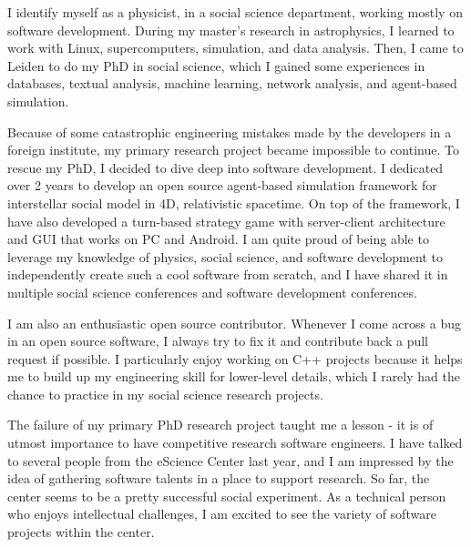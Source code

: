 \documentclass[11pt, a4paper]{awesome-cv}
\begin{document}
\makecvheader[R]

\makecvfooter
  {}%
  {}%
  {}

\makelettertitle

\begin{cvletter}

I identify myself as a physicist, in a social science department, working mostly on software development.
During my master's research in astrophysics,
I learned to work with Linux, supercomputers, simulation, and data analysis.
Then, I came to Leiden to do my PhD in social science,
which I gained some experiences in databases, textual analysis, machine learning, network analysis,
and agent-based simulation.

Because of some catastrophic engineering mistakes made by the developers in a foreign institute,
my primary research project became impossible to continue.
To rescue my PhD, I decided to dive deep into software development.
I dedicated over 2 years to develop an open source agent-based simulation framework for interstellar social model
in 4D, relativistic spacetime.
On top of the framework, I have also developed a turn-based strategy game with server-client architecture
and GUI that works on PC and Android.
I am quite proud of being able to leverage my knowledge of physics, social science, and software development
to independently create such a cool software from scratch, and I have shared it in multiple social science conferences
and software development conferences.

I am also an enthusiastic open source contributor. 
Whenever I come across a bug in an open source software,
I always try to fix it and contribute back a pull request if possible.
I particularly enjoy working on C++ projects because it helps me
to build up my engineering skill for lower-level details,
which I rarely had the chance to practice in my social science research projects.

The failure of my primary PhD research project taught me a lesson -
it is of utmost importance to have competitive research software engineers.
I have talked to several people from the eScience Center last year,
and I am impressed by the idea of gathering software talents in a place to support research.
So far, the center seems to be a pretty successful social experiment.
As a technical person who enjoys intellectual challenges,
I am excited to see the variety of software projects within the center.


\end{cvletter}
\end{document}
